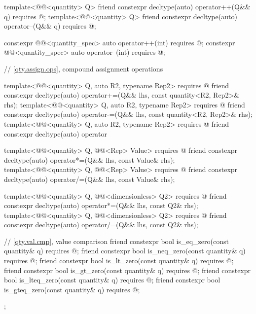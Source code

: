 \begin{codeblock}
{{  template<@@<quantity> Q>
  friend constexpr decltype(auto) operator++(Q&& q)
    requires @\seebelownc@;
  template<@@<quantity> Q>
  friend constexpr decltype(auto) operator--(Q&& q)
    requires @\seebelownc@;

  constexpr @@<quantity_spec> auto operator++(int)
    requires @\seebelownc@;
  constexpr @@<quantity_spec> auto operator--(int)
    requires @\seebelownc@;

  // \ref{qty.assign.ops}, compound assignment operations

  template<@@<quantity> Q, auto R2, typename Rep2>
    requires @\seebelownc@
  friend constexpr decltype(auto) operator+=(Q&& lhs, const quantity<R2, Rep2>& rhs);
  template<@@<quantity> Q, auto R2, typename Rep2>
    requires @\seebelownc@
  friend constexpr decltype(auto) operator-=(Q&& lhs, const quantity<R2, Rep2>& rhs);
  template<@@<quantity> Q, auto R2, typename Rep2>
    requires @\seebelownc@
  friend constexpr decltype(auto) operator%

  template<@@<quantity> Q, @@<Rep> Value>
    requires @\seebelownc@
  friend constexpr decltype(auto) operator*=(Q&& lhs, const Value& rhs);
  template<@@<quantity> Q, @@<Rep> Value>
    requires @\seebelownc@
  friend constexpr decltype(auto) operator/=(Q&& lhs, const Value& rhs);

  template<@@<quantity> Q, @@<dimensionless> Q2>
    requires @\seebelownc@
  friend constexpr decltype(auto) operator*=(Q&& lhs, const Q2& rhs);
  template<@@<quantity> Q, @@<dimensionless> Q2>
    requires @\seebelownc@
  friend constexpr decltype(auto) operator/=(Q&& lhs, const Q2& rhs);

  // \ref{qty.val.cmp}, value comparison
  friend constexpr bool is_eq_zero(const quantity& q) requires @\seebelownc@;
  friend constexpr bool is_neq_zero(const quantity& q) requires @\seebelownc@;
  friend constexpr bool is_lt_zero(const quantity& q) requires @\seebelownc@;
  friend constexpr bool is_gt_zero(const quantity& q) requires @\seebelownc@;
  friend constexpr bool is_lteq_zero(const quantity& q) requires @\seebelownc@;
  friend constexpr bool is_gteq_zero(const quantity& q) requires @\seebelownc@;
};

}
\end{codeblock}

